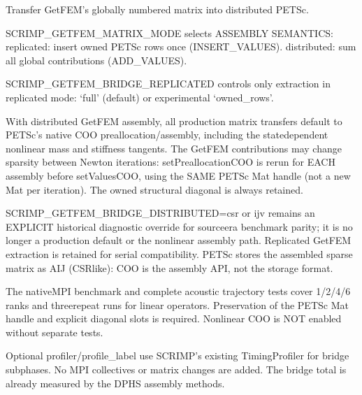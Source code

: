 \documentclass[letterpaper,10pt,english]{sphinxmanual}
\begin{document}
\begin{fulllineitems}
\label{\detokenize{scrimp.utils:scrimp.utils.linalg.convert_gmm_to_petsc}}
\pysigstartsignatures
\pysiglinewithargsret
{}
{\sphinxparamcomma {}\sphinxparamcomma {}\sphinxparamcomma {}\sphinxparamcomma {}\sphinxparamcomma {}\sphinxparamcomma {}}
{}
\pysigstopsignatures
\sphinxAtStartPar
Transfer GetFEM’s globally numbered matrix into distributed PETSc.

\sphinxAtStartPar
SCRIMP\_GETFEM\_MATRIX\_MODE selects ASSEMBLY SEMANTICS:
\sphinxhyphen{} replicated: insert owned PETSc rows once (INSERT\_VALUES).
\sphinxhyphen{} distributed: sum all global contributions (ADD\_VALUES).

\sphinxAtStartPar
SCRIMP\_GETFEM\_BRIDGE\_REPLICATED controls only extraction in
replicated mode: ‘full’ (default) or experimental ‘owned\_rows’.

\sphinxAtStartPar
With distributed GetFEM assembly, all production matrix transfers
default to PETSc’s native COO preallocation/assembly, including the
state\sphinxhyphen{}dependent nonlinear mass and stiffness tangents. The GetFEM
contributions may change sparsity between Newton iterations:
setPreallocationCOO is rerun for EACH assembly before setValuesCOO,
using the SAME PETSc Mat handle (not a new Mat per iteration).
The owned structural diagonal is always retained.

\sphinxAtStartPar
SCRIMP\_GETFEM\_BRIDGE\_DISTRIBUTED=csr or ijv remains an EXPLICIT
historical diagnostic override for source\sphinxhyphen{}era benchmark parity;
it is no longer a production default or the nonlinear assembly path.
Replicated GetFEM extraction is retained for serial compatibility.
PETSc stores the assembled sparse matrix as AIJ (CSR\sphinxhyphen{}like):
COO is the assembly API, not the storage format.

\sphinxAtStartPar
The native\sphinxhyphen{}MPI benchmark and complete acoustic trajectory tests
cover 1/2/4/6 ranks and three\sphinxhyphen{}repeat runs for linear operators.
Preservation of the PETSc Mat handle and explicit diagonal slots
is required. Nonlinear COO is NOT enabled without separate tests.

\sphinxAtStartPar
Optional profiler/profile\_label use SCRIMP’s existing TimingProfiler
for bridge subphases. No MPI collectives or matrix changes are added.
The bridge total is already measured by the DPHS assembly methods.

\end{fulllineitems}
\end{document}
